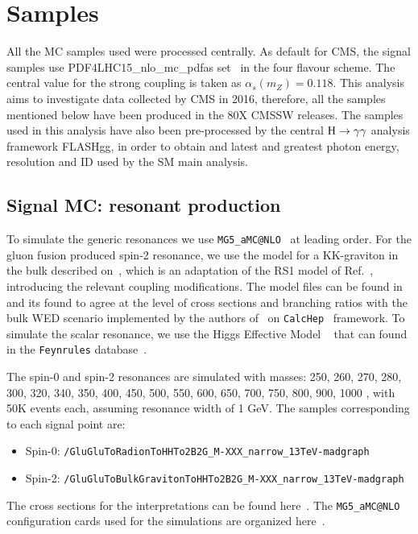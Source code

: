 \section{Samples}
\label{sec:samples}

All the MC samples used were processed centrally. As default for CMS, the signal samples use PDF4LHC15\_nlo\_mc\_pdfas set~\cite{Carrazza:2015hva, Butterworth:2015oua, Dulat:2015mca,Harland-Lang:2014zoa, Ball:2014uwa} in the four flavour scheme. The central value for the strong coupling is taken as $\alpha_s(m_Z) = 0.118$. This analysis aims to investigate data collected by CMS in 2016, therefore, all the samples mentioned below have been produced in the 80X CMSSW releases. 
The samples used in this analysis have also been pre-processed by the central $\mathrm{H}\to\gamma\gamma$ analysis framework FLASHgg, in order to obtain and latest and greatest photon energy, resolution and ID used by the SM main analysis.

\subsection{Signal MC: resonant production}

To simulate the generic resonances we use {\tt MG5\_aMC@NLO}~\cite{Alwall:2014hca} at leading order. 
For the gluon fusion produced spin-2 resonance, we use the model for a KK-graviton in the bulk described on~\cite{Oliveira:2010uv}, which is an adaptation of the RS1 model of Ref.~\cite{deAquino:2011ix, aquino}, introducing  the relevant coupling modifications. The model files can be found in~\cite{WEDtwiki} and its found to agree at the level of cross sections and branching ratios with the bulk WED scenario implemented by the authors of~\cite{Tuomas} on {\tt CalcHep}~\cite{Belyaev:2012qa} framework.
To simulate the scalar resonance, we use the Higgs Effective Model ~\cite{heft} that can found in the {\tt Feynrules} database~\cite{Alloul:2013bka}.

The spin-0 and spin-2 resonances are simulated with masses: 250, 260, 270, 280, 300, 320, 340, 350, 400, 450, 500, 550, 600, 650, 700,
750, 800, 900, 1000 \GeV, with 50K events each, assuming resonance width of 1 GeV. The samples corresponding to each signal point are:
\begin{itemize}
  \item Spin-0: \verb|/GluGluToRadionToHHTo2B2G_M-XXX_narrow_13TeV-madgraph|
  \item Spin-2: \verb|/GluGluToBulkGravitonToHHTo2B2G_M-XXX_narrow_13TeV-madgraph|
\end{itemize}
The cross sections for the interpretations can be found here~\cite{cx}. The {\tt MG5\_aMC@NLO} configuration cards used for the simulations are organized here~\cite{cards}. 
 
